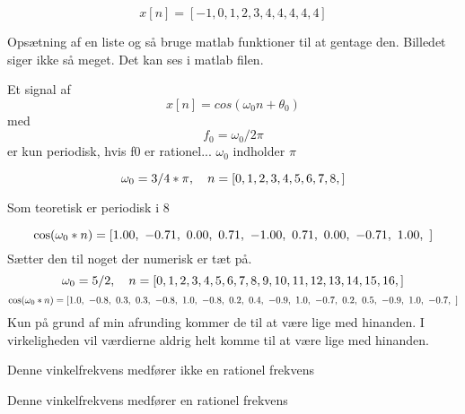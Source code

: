 \begin{Opgaver}
\begin{kapitel}
        \begin{Opgave}
        \end{Opgave}

        \begin{Opgave}
            \[x[n] = [-1, 0, 1, 2, 3, 4, 4, 4, 4, 4]\]
        \end{Opgave}

        \begin{Opgave}
            Opsætning af en liste og så bruge matlab funktioner til at gentage den. 
            Billedet siger ikke så meget. Det kan ses i matlab filen. 
        \end{Opgave}

        \begin{Opgave}
            Et signal af \[x[n] = cos(\omega_0n + \theta_0)\] med 
            \[f_0 = \omega_0/2\pi\] er kun periodisk, hvis f0 er rationel... $\omega_0$ indholder $\pi$
            \begin{UnderOpgave}
                \[\omega_0 = 3/4*\pi,\quad n = [\foreach \i in {0,1,...,8} {\i,}]\]
            
                Som teoretisk er periodisk i 8
                
                \[\cos(\omega_0*n) = [\foreach \n in {0, ..., 8} {
                    \num[round-mode=places,round-precision=2]{\fpeval{cos(3/4*pi*\n)}}, ~}
                    ]\]
                Sætter den til noget der numerisk er tæt på. 
                \[\omega_0 = 5/2,\quad n = [\foreach \i in {0,1,...,16} {\i,}]\]
                \[\cos(\omega_0*n) = [\foreach \n in {0, ..., 16} {
                    \num[round-mode=places,round-precision=1]{\fpeval{cos(5/2*\n)}}, ~}
                    ]\]
                Kun på grund af min afrunding kommer de til at være lige med hinanden. 
                I virkeligheden vil værdierne aldrig helt komme til at være lige med hinanden.
                \newline \vspace{10pt}
            \end{UnderOpgave}
                
            \begin{UnderOpgave}[\ensuremath{\cos(n/10), n =[-20, ... 20]} Kan jeg konkludere periodicitet ud fra plot?]
                Denne vinkelfrekvens medfører ikke en rationel frekvens
            \end{UnderOpgave}
            \begin{UnderOpgave}[\ensuremath{\cos(\pi/10n), n =[-20, ... 20]} Kan jeg konkludere periodicitet ud fra plot?]
                Denne vinkelfrekvens medfører en rationel frekvens
            \end{UnderOpgave}
            

\end{Opgave}
\end{kapitel}
\end{Opgaver}
